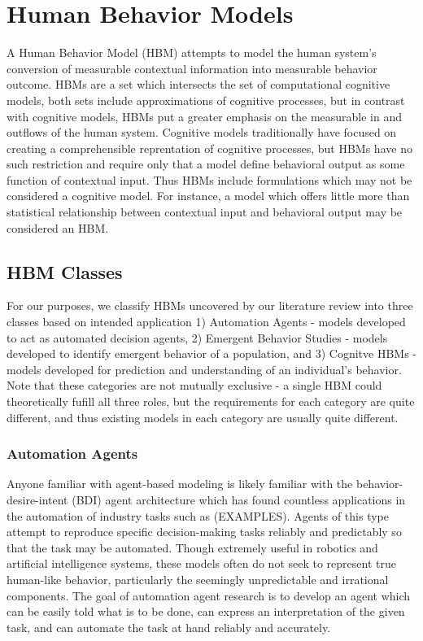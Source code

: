 \section{Human Behavior Models}
A Human Behavior Model (HBM) attempts to model the human system’s conversion of measurable contextual information into measurable behavior outcome. 
HBMs are a set which intersects the set of computational cognitive models, both sets include approximations of cognitive processes, but in contrast with cognitive models, HBMs put a greater emphasis on the measurable in and outflows of the human system.
Cognitive models traditionally have focused on creating a comprehensible reprentation of cognitive processes, but HBMs have no such restriction and require only that a model define behavioral output as some function of contextual input.
Thus HBMs include formulations which may not be considered a cognitive model.
For instance, a model which offers little more than statistical relationship between contextual input and behavioral output may be considered an HBM.

\subsection{HBM Classes}
For our purposes, we classify HBMs uncovered by our literature review into three classes based on intended application 1) Automation Agents - models developed to act as automated decision agents, 2) Emergent Behavior Studies - models developed to identify emergent behavior of a population, and 3) Cognitve HBMs - models developed for prediction and understanding of an individual's behavior.
Note that these categories are not mutually exclusive - a single HBM could theoretically fufill all three roles, but the requirements for each category are quite different, and thus existing models in each category are usually quite different.

\subsubsection{Automation Agents}
Anyone familiar with agent-based modeling is likely familiar with the behavior-desire-intent (BDI) agent architecture which has found countless applications in the automation of industry tasks such as (EXAMPLES). 
Agents of this type attempt to reproduce specific decision-making tasks reliably and predictably so that the task may be automated. 
Though extremely useful in robotics and artificial intelligence systems, these models often do not seek to represent true human-like behavior, particularly the seemingly unpredictable and irrational components. 
The goal of automation agent research is to develop an agent which can be easily told what is to be done, can express an interpretation of the given task, and can automate the task at hand reliably and accurately.

